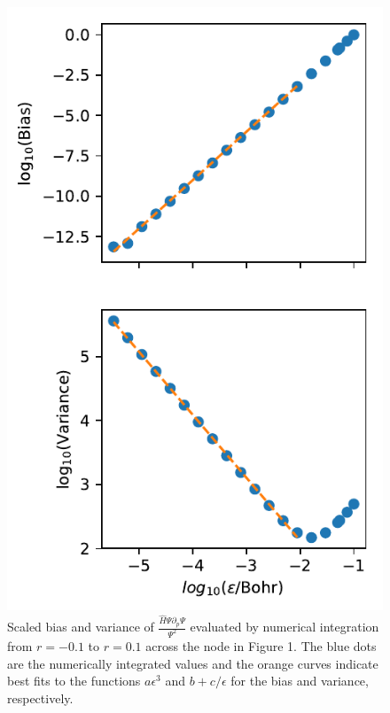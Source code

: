 \documentclass[twocolumn]{revtex4-1}
\begin{document}
\begin{figure}
\includegraphics{../2_plots/integratenode.pdf}
\caption{Scaled bias and variance of $\frac{\hat{H}\Psi \partial_p \Psi}{\Psi^2}$ evaluated by numerical integration from $r = -0.1$ to $r = 0.1$ across the node in Figure 1. The blue dots are the numerically integrated values and the orange curves indicate best fits to the functions $a\epsilon^3$ and $b + c/\epsilon$ for the bias and variance, respectively.}
\end{figure}
\end{document}
